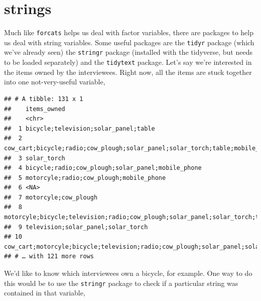\documentclass[]{book}
\newenvironment{Shaded}{\begin{snugshade}}{\end{snugshade}}
\newcommand{\KeywordTok}[1]{\textcolor[rgb]{0.13,0.29,0.53}{\textbf{#1}}}
\newcommand{\DataTypeTok}[1]{\textcolor[rgb]{0.13,0.29,0.53}{#1}}
\newcommand{\StringTok}[1]{\textcolor[rgb]{0.31,0.60,0.02}{#1}}
\newcommand{\OperatorTok}[1]{\textcolor[rgb]{0.81,0.36,0.00}{\textbf{#1}}}
\newcommand{\NormalTok}[1]{#1}
\begin{document}
\section{strings}\label{strings}

Much like \texttt{forcats} helps us deal with factor variables, there
are packages to help us deal with string variables. Some useful packages
are the \texttt{tidyr} package (which we've already seen) the
\texttt{stringr} package (installed with the tidyverse, but needs to be
loaded separately) and the \texttt{tidytext} package. Let's say we're
interested in the items owned by the interviewees. Right now, all the
items are stuck together into one not-very-useful variable,

\begin{Shaded}
\end{Shaded}

\begin{verbatim}
## # A tibble: 131 x 1
##    items_owned                                                                  
##    <chr>                                                                        
##  1 bicycle;television;solar_panel;table                                         
##  2 cow_cart;bicycle;radio;cow_plough;solar_panel;solar_torch;table;mobile_phone 
##  3 solar_torch                                                                  
##  4 bicycle;radio;cow_plough;solar_panel;mobile_phone                            
##  5 motorcyle;radio;cow_plough;mobile_phone                                      
##  6 <NA>                                                                         
##  7 motorcyle;cow_plough                                                         
##  8 motorcyle;bicycle;television;radio;cow_plough;solar_panel;solar_torch;table;…
##  9 television;solar_panel;solar_torch                                           
## 10 cow_cart;motorcyle;bicycle;television;radio;cow_plough;solar_panel;solar_tor…
## # … with 121 more rows
\end{verbatim}

We'd like to know which interviewees own a bicycle, for example. One way
to do this would be to use the \texttt{stringr} package to check if a
particular string was contained in that variable,

\begin{Shaded}
\end{Shaded}
\end{document}
